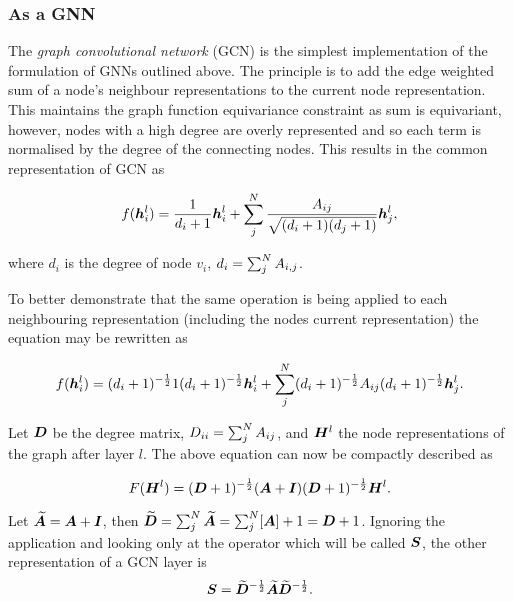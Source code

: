 

\subsubsection{As a GNN}

The \emph{graph convolutional network} (GCN) is the simplest implementation of the formulation of GNNs outlined above.
The principle is to add the edge weighted sum of a node's neighbour representations to the current node representation.
This maintains the graph function equivariance constraint as sum is equivariant, however, nodes with a high degree are overly represented and so each term is normalised by the degree of the connecting nodes.
This results in the common representation of GCN as

\begin{equation}
    f({\bm{h}}_i^l) = \frac1{d_i + 1}{\bm{h}}_i^l + \sum_j^N\frac{{A}_{ij}}{\sqrt{(d_i + 1)(d_j + 1)}}{\bm{h}}_j^{l},
\end{equation}

where $d_i$ is the degree of node $v_i$, $d_i = \sum_j^N {A}_{i,j}$.

To better demonstrate that the same operation is being applied to each neighbouring representation (including the nodes current representation) the equation may be rewritten as

\begin{equation}
    f({\bm{h}}_i^l) = (d_i + 1)^{-\frac12}1(d_i + 1)^{-\frac12}{\bm{h}}_i^l + \sum_j^N(d_i + 1)^{-\frac12}{A}_{ij}(d_i + 1)^{-\frac12}{\bm{h}}_j^{l}.
\end{equation}

Let ${\bm{D}}$ be the degree matrix, ${D}_{ii} = \sum_j^N {A}_{ij}$, and ${\bm{H}}^l$ the node representations of the graph after layer $l$. The above equation can now be compactly described as 

\begin{equation}
    F({\bm{H}}^l) = ({\bm{D}} + 1)^{-\frac12}({\bm{A}} + {\bm{I}})({\bm{D}} + 1)^{-\frac12}{\bm{H}}^l.
\end{equation}

Let $\widetilde{{\bm{A}}} = {\bm{A}} + {\bm{I}}$, then $\widetilde{{\bm{D}}} = \sum_j^N \widetilde{{\bm{A}}} = \sum_j^N[{\bm{A}}] + 1 = {\bm{D}} + 1$.
Ignoring the application and looking only at the operator which will be called ${\bm{S}}$, the other representation of a GCN layer is
\begin{equation}
    {\bm{S}} = \widetilde{{\bm{D}}}^{-\frac12}\widetilde{{\bm{A}}}\widetilde{{\bm{D}}}^{-\frac12}.
\end{equation}


